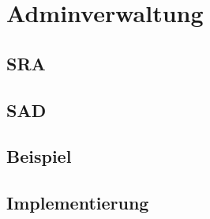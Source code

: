 \section{Adminverwaltung}
\subsection{SRA}
\begin{frame}
 
\end{frame}
\subsection{SAD}
\subsection{Beispiel}
\subsection{Implementierung}